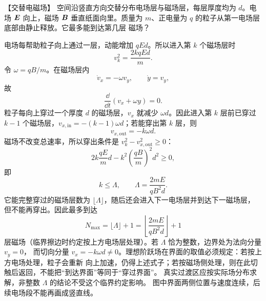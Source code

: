 {\begin{origexamplebox}{【交替电磁场】}\label{ch22:ex:s38-7-10}
空间沿竖直方向交替分布电场层与磁场层，每层厚度均为 $d$。电场 $\bm{E}$ 向上，磁场 $\bm{B}$
垂直纸面向里。质量为 $m$、正电量为 $q$ 的粒子从第一电场层底部由静止释放。它最多能到达第几层
磁场？

\begin{center}\begin{minipage}{.96\linewidth}\centering
{}
\end{minipage}\end{center}
\end{origexamplebox}\par\nopagebreak[4]

\begin{xesolution}
电场每帮助粒子向上通过一层，动能增加 $qEd$。所以进入第 $k$ 个磁场层时
\begin{equation}
  v_k^2=\frac{2kqEd}{m}.
\end{equation}
令 $\omega=qB/m$。在磁场层内
\[
  \dot v_x=-\omega v_y,
  \qquad \dot y=v_y,
\]
故
\begin{equation}
  \frac{\dd}{\dd t}(v_x+\omega y)=0.
\end{equation}
粒子每向上穿过一个厚度 $d$ 的磁场层，$v_x$ 就减少 $\omega d$。因此进入第 $k$ 层前已穿过
$k-1$ 个磁场层，$v_{x,\mathrm{in}}=-(k-1)\omega d$；若能穿出第 $k$ 层，则
\[
  v_{x,\mathrm{out}}=-k\omega d.
\]
磁场不改变总速率，所以穿出条件是 $v_k^2-v_{x,\mathrm{out}}^2\ge0$：
\begin{equation}
  2k\frac{qE}{m}d-k^2\left(\frac{qB}{m}\right)^2d^2\ge0,
\end{equation}
即
\begin{equation}
  k\le \Lambda,
  \qquad \Lambda=\frac{2mE}{qB^2d}.
\end{equation}
它能完整穿过的磁场层数为 $\lfloor\Lambda\rfloor$，随后还会进入下一电场层并到达下一磁场层，
但不能再穿出。因此最多到达
\begin{equation}
  \boxed{N_{\max}=\lfloor\Lambda\rfloor+1
  =\left\lfloor\frac{2mE}{qB^2d}\right\rfloor+1}
\end{equation}
层磁场（临界擦边时约定按上方电场层处理）。若 $\Lambda$ 恰为整数，边界处为法向分量 $v_y=0$，
而切向分量 $v_x=-k\omega d\ne0$。理想阶跃场在界面的取值必须规定：若按上方电场处理，粒子会重新
向上加速，仍得上述式子；若按磁场侧处理，则在此切触后返回，不能把“到达界面”等同于“穿过界面”。
真实过渡区应按实际场分布求解，非整数 $\Lambda$ 的结论不受这个临界约定影响。
图中界面两侧位置与速度连续，后续电场段不能再画成竖直线。


\end{xesolution}}
